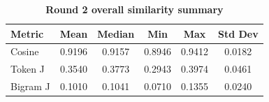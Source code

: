 \begin{table}[htbp]
\centering
\caption{\textbf{Round 2 overall similarity summary}}
\label{tab:round2-similarity-summary}
\renewcommand{\arraystretch}{1.4}
\begin{tabular}{|l|c|c|c|c|c|}
\hline
\textbf{Metric} & \textbf{Mean} & \textbf{Median} & \textbf{Min} & \textbf{Max} & \textbf{Std Dev} \\
\hline
Cosine & 0.9196 & 0.9157 & 0.8946 & 0.9412 & 0.0182 \\
\hline
Token J & 0.3540 & 0.3773 & 0.2943 & 0.3974 & 0.0461 \\
\hline
Bigram J & 0.1010 & 0.1041 & 0.0710 & 0.1355 & 0.0240 \\
\hline
\end{tabular}
\end{table}

